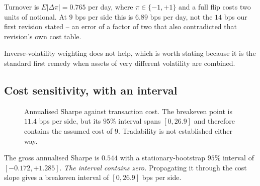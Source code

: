 \documentclass[preprint,12pt,authoryear]{elsarticle}
\begin{document}
Turnover is $E|\Delta \pi| = 0.765$ per day, where $\pi \in \{-1, +1\}$ and a full
flip costs two units of notional. At $9$ bps per side this is $6.89$ bps per day,
not the $14$ bps our first revision stated -- an error of a factor of two that
also contradicted that revision's own cost table.

Inverse-volatility weighting does not help, which is worth stating because it is
the standard first remedy when assets of very different volatility are combined.

\subsection{Cost sensitivity, with an interval}
\label{ssec:costs}

\begin{figure}[t]\centering
{}
\caption{Annualised Sharpe against transaction cost. The breakeven point is
$11.4$ bps per side, but its $95\%$ interval spans $[0, 26.9]$ and therefore
contains the assumed cost of $9$. Tradability is not established either way.}
\label{fig:cost}
\end{figure}

The gross annualised Sharpe is $0.544$ with a stationary-bootstrap $95\%$
interval of $[-0.172, +1.285]$. \emph{The interval contains zero.} Propagating it
through the cost slope gives a breakeven interval of $[0, 26.9]$ bps per side.
\end{document}
